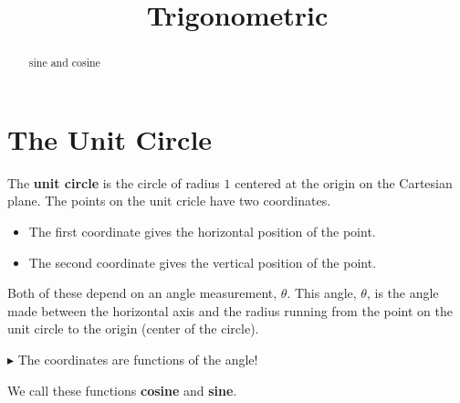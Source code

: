\documentclass{ximera}
\title{Trigonometric}
\begin{document}
\begin{abstract}
sine and cosine
\end{abstract}
\maketitle















\section{The Unit Circle}


The \textbf{unit circle} is the circle of radius $1$ centered at the origin on the Cartesian plane. The points on the unit cricle have two coordinates.  

\begin{itemize}
\item The first coordinate gives the horizontal position of the point. 
\item The second coordinate gives the vertical position of the point.  
\end{itemize}

Both of these depend on an angle measurement, $\theta$. This angle, $\theta$, is the angle made between the horizontal axis and the radius running from the point on the unit circle to the origin (center of the circle).


\textbf{\textcolor{red!90!darkgray}{$\blacktriangleright$}}  The coordinates are functions of the angle!

We call these functions \textbf{cosine} and \textbf{sine}.
\end{document}
